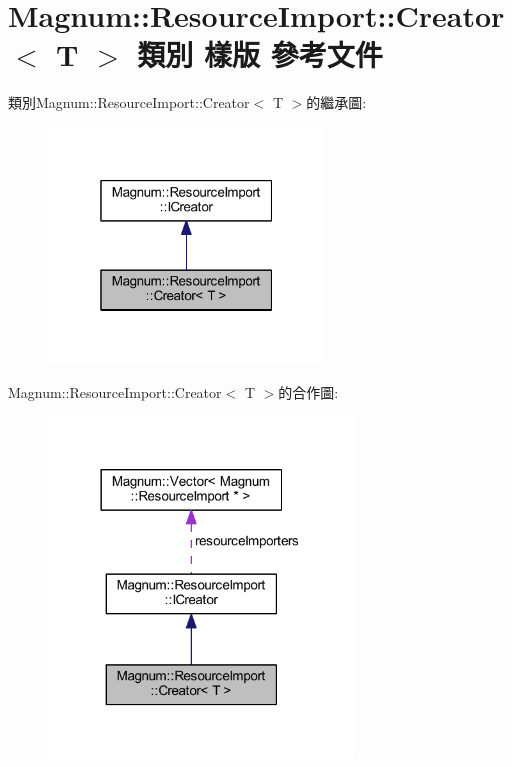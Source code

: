 \hypertarget{class_magnum_1_1_resource_import_1_1_creator}{}\section{Magnum\+:\+:Resource\+Import\+:\+:Creator$<$ T $>$ 類別 樣版 參考文件}
\label{class_magnum_1_1_resource_import_1_1_creator}


類別\+Magnum\+:\+:Resource\+Import\+:\+:Creator$<$ T $>$的繼承圖\+:\nopagebreak
\begin{figure}[H]
\begin{center}
\leavevmode
\includegraphics[width=208pt]{class_magnum_1_1_resource_import_1_1_creator__inherit__graph}
\end{center}
\end{figure}


Magnum\+:\+:Resource\+Import\+:\+:Creator$<$ T $>$的合作圖\+:\nopagebreak
\begin{figure}[H]
\begin{center}
\leavevmode
\includegraphics[width=230pt]{class_magnum_1_1_resource_import_1_1_creator__coll__graph}
\end{center}
\end{figure}
